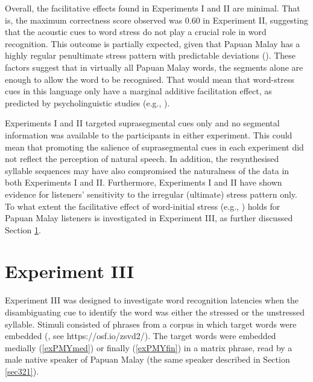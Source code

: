 Overall, the facilitative effects found in Experiments I and II are minimal. That is, the maximum correctness score observed was 0.60 in Experiment II, suggesting that the acoustic cues to word stress do not play a crucial role in word recognition. This outcome is partially expected, given that Papuan Malay has a highly regular penultimate stress pattern with predictable deviations (\citealt{peperkamp_perception_2010}). These factors suggest that in virtually all Papuan Malay words, the segments alone are enough to allow the word to be recognised. That would mean that word-stress cues in this language only have a marginal additive facilitation effect, as predicted by psycholinguistic studies (e.g., \citealt{cutler_native_2012}).

Experiments I and II targeted suprasegmental cues only and no segmental information was available to the participants in either experiment. This could mean that promoting the salience of suprasegmental cues in each experiment did not reflect the perception of natural speech. In addition, the resynthesised syllable sequences may have also compromised the naturalness of the data in both Experiments I and II. Furthermore, Experiments I and II have shown evidence for listeners' sensitivity to the irregular (ultimate) stress pattern only. To what extent the facilitative effect of word-initial stress (e.g., \citealt{mehta_detection_1988}) holds for Papuan Malay listeners is investigated in Experiment III, as further discussed Section \ref{sec34}.

\section{Experiment III} \label{sec34}

Experiment III was designed to investigate word recognition latencies when the disambiguating cue to identify the word was either the stressed or the unstressed syllable. Stimuli consisted of phrases from a corpus in which target words were embedded (\citealt{kluge_papuan_2014}, see https://osf.io/zsvd2/). The target words were embedded medially (\ref{exPMYmed}) or finally (\ref{exPMYfin}) in a matrix phrase, read by a male native speaker of Papuan Malay (the same speaker described in Section \ref{sec321}).

